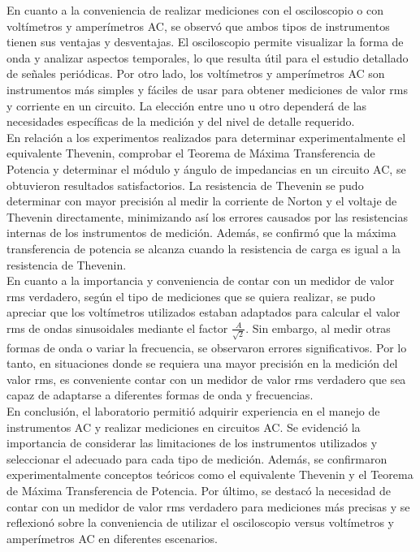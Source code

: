 \documentclass[12pt]{article}
\begin{document}
	En cuanto a la conveniencia de realizar mediciones con el osciloscopio o con voltímetros y amperímetros AC, se observó que ambos tipos de instrumentos tienen sus ventajas y desventajas. El osciloscopio permite visualizar la forma de onda y analizar aspectos temporales, lo que resulta útil para el estudio detallado de señales periódicas. Por otro lado, los voltímetros y amperímetros AC son instrumentos más simples y fáciles de usar para obtener mediciones de valor rms y corriente en un circuito. La elección entre uno u otro dependerá de las necesidades específicas de la medición y del nivel de detalle requerido.\\
	
	En relación a los experimentos realizados para determinar experimentalmente el equivalente Thevenin, comprobar el Teorema de Máxima Transferencia de Potencia y determinar el módulo y ángulo de impedancias en un circuito AC, se obtuvieron resultados satisfactorios. La resistencia de Thevenin se pudo determinar con mayor precisión al medir la corriente de Norton y el voltaje de Thevenin directamente, minimizando así los errores causados por las resistencias internas de los instrumentos de medición. Además, se confirmó que la máxima transferencia de potencia se alcanza cuando la resistencia de carga es igual a la resistencia de Thevenin.\\
	
	En cuanto a la importancia y conveniencia de contar con un medidor de valor rms verdadero, según el tipo de mediciones que se quiera realizar, se pudo apreciar que los voltímetros utilizados estaban adaptados para calcular el valor rms de ondas sinusoidales mediante el factor $\frac{A}{\sqrt{2}}$. Sin embargo, al medir otras formas de onda o variar la frecuencia, se observaron errores significativos. Por lo tanto, en situaciones donde se requiera una mayor precisión en la medición del valor rms, es conveniente contar con un medidor de valor rms verdadero que sea capaz de adaptarse a diferentes formas de onda y frecuencias.\\
	
	En conclusión, el laboratorio permitió adquirir experiencia en el manejo de instrumentos AC y realizar mediciones en circuitos AC. Se evidenció la importancia de considerar las limitaciones de los instrumentos utilizados y seleccionar el adecuado para cada tipo de medición. Además, se confirmaron experimentalmente conceptos teóricos como el equivalente Thevenin y el Teorema de Máxima Transferencia de Potencia. Por último, se destacó la necesidad de contar con un medidor de valor rms verdadero para mediciones más precisas y se reflexionó sobre la conveniencia de utilizar el osciloscopio versus voltímetros y amperímetros AC en diferentes escenarios.\\
	
	\newpage
	
\end{document}
